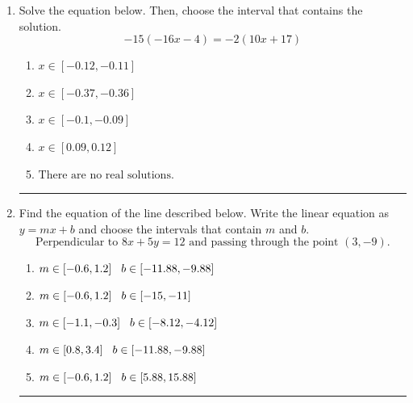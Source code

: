 \documentclass[14pt]{extbook}
\newcommand{\litem}[1]{\item#1\hspace*{-1cm}\rule{\textwidth}{0.4pt}}
\begin{document}
\begin{enumerate}
{\begin{enumerate}[label=\Alph*.]
\end{enumerate} }
\litem{
Solve the equation below. Then, choose the interval that contains the solution.\[ -15(-16x -4) = -2(10x + 17) \]\begin{enumerate}[label=\Alph*.]
\item \( x \in [-0.12, -0.11] \)
\item \( x \in [-0.37, -0.36] \)
\item \( x \in [-0.1, -0.09] \)
\item \( x \in [0.09, 0.12] \)
\item \( \text{There are no real solutions.} \)

\end{enumerate} }
\litem{
Find the equation of the line described below. Write the linear equation as $ y=mx+b $ and choose the intervals that contain $m$ and $b$.\[ \text{Perpendicular to } 8 x + 5 y = 12 \text{ and passing through the point } (3, -9). \]\begin{enumerate}[label=\Alph*.]
\item \( m \in [-0.6, 1.2] \hspace*{3mm} b \in [-11.88, -9.88] \)
\item \( m \in [-0.6, 1.2] \hspace*{3mm} b \in [-15, -11] \)
\item \( m \in [-1.1, -0.3] \hspace*{3mm} b \in [-8.12, -4.12] \)
\item \( m \in [0.8, 3.4] \hspace*{3mm} b \in [-11.88, -9.88] \)
\item \( m \in [-0.6, 1.2] \hspace*{3mm} b \in [5.88, 15.88] \)


\end{enumerate}}
\end{enumerate}
\end{document}
